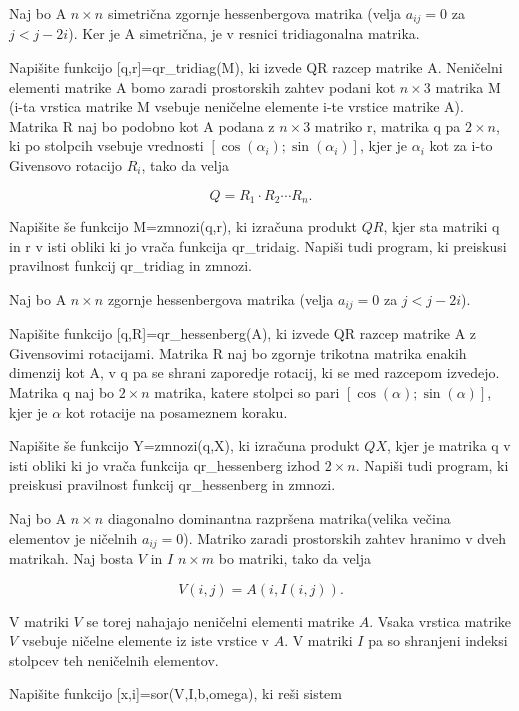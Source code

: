 \documentclass{article}
\begin{document}
Naj bo A \(n\times n\) simetrična zgornje hessenbergova matrika (velja \(a_{ij}=0\) za \(j< j-2i\)). Ker je A simetrična,  je v resnici tridiagonalna matrika.

Napišite funkcijo [q,r]=qr_tridiag(M), ki izvede QR razcep matrike A. Neničelni elementi matrike A bomo zaradi prostorskih zahtev podani kot \(n\times 3\) matrika M (i-ta vrstica matrike M vsebuje neničelne elemente i-te vrstice matrike A). Matrika R naj bo podobno kot A podana z \(n\times 3\) matriko r, matrika q pa \(2\times n\), ki po stolpcih vsebuje vrednosti \([\cos(\alpha_i); \sin(\alpha_i)]\), kjer je \(\alpha_i\) kot za i-to Givensovo rotacijo \(R_i\), tako da velja

\[Q=R_1\cdot R_2\cdots R_n.\] 

Napišite še funkcijo M=zmnozi(q,r), ki izračuna produkt \(QR\), kjer sta matriki q in r v isti obliki ki jo vrača funkcija qr_tridaig. Napiši tudi program, ki preiskusi pravilnost funkcij qr_tridiag in zmnozi.



Naj bo A \(n\times n\) zgornje hessenbergova matrika (velja \(a_{ij}=0\) za \(j< j-2i\)).

Napišite funkcijo [q,R]=qr_hessenberg(A), ki izvede QR razcep matrike A z Givensovimi rotacijami. Matrika R naj bo zgornje trikotna matrika enakih dimenzij kot A, v q pa se shrani zaporedje rotacij, ki se med razcepom izvedejo. Matrika q naj bo \(2\times n\) matrika, katere stolpci so pari \([\cos(\alpha); \sin(\alpha)]\), kjer je \(\alpha\) kot rotacije na posameznem koraku.   

Napišite še funkcijo Y=zmnozi(q,X), ki izračuna produkt \(QX\), kjer je matrika q v isti obliki ki jo vrača funkcija qr_hessenberg izhod \(2\times n\). Napiši tudi program, ki preiskusi pravilnost funkcij qr_hessenberg in zmnozi.

Naj bo A \(n\times n\) diagonalno dominantna razpršena matrika(velika večina elementov je ničelnih \(a_{ij}=0\)). Matriko zaradi prostorskih zahtev hranimo v dveh matrikah. Naj bosta \(V\) in \(I\) \(n\times m\) bo matriki, tako da velja

\[V(i,j)=A(i,I(i,j)).\]

V matriki \(V\) se torej nahajajo neničelni elementi matrike \(A\). Vsaka vrstica matrike \(V\) vsebuje ničelne elemente iz iste vrstice v \(A\). V matriki \(I\) pa so shranjeni indeksi stolpcev teh neničelnih elementov. 

Napišite funkcijo [x,i]=sor(V,I,b,omega), ki reši sistem
\end{document}
